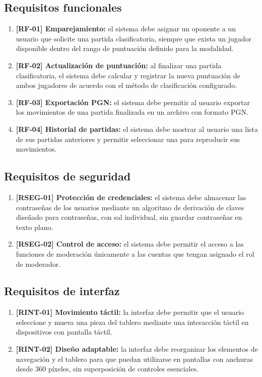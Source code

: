\documentclass[12pt,a4paper]{article}
\begin{document}
\subsection{Requisitos funcionales}

\begin{enumerate}[leftmargin=*]
    \item \textbf{[RF-01] Emparejamiento:} el sistema debe asignar un oponente a un usuario que solicite una partida clasificatoria, siempre que exista un jugador disponible dentro del rango de puntuación definido para la modalidad.
    \item \textbf{[RF-02] Actualización de puntuación:} al finalizar una partida clasificatoria, el sistema debe calcular y registrar la nueva puntuación de ambos jugadores de acuerdo con el método de clasificación configurado.
    \item \textbf{[RF-03] Exportación PGN:} el sistema debe permitir al usuario exportar los movimientos de una partida finalizada en un archivo con formato PGN.
    \item \textbf{[RF-04] Historial de partidas:} el sistema debe mostrar al usuario una lista de sus partidas anteriores y permitir seleccionar una para reproducir sus movimientos.
\end{enumerate}

\subsection{Requisitos de seguridad}

\begin{enumerate}[leftmargin=*]
    \item \textbf{[RSEG-01] Protección de credenciales:} el sistema debe almacenar las contraseñas de los usuarios mediante un algoritmo de derivación de claves diseñado para contraseñas, con sal individual, sin guardar contraseñas en texto plano.
    \item \textbf{[RSEG-02] Control de acceso:} el sistema debe permitir el acceso a las funciones de moderación únicamente a las cuentas que tengan asignado el rol de moderador.
\end{enumerate}

\subsection{Requisitos de interfaz}

\begin{enumerate}[leftmargin=*]
    \item \textbf{[RINT-01] Movimiento táctil:} la interfaz debe permitir que el usuario seleccione y mueva una pieza del tablero mediante una interacción táctil en dispositivos con pantalla táctil.
    \item \textbf{[RINT-02] Diseño adaptable:} la interfaz debe reorganizar los elementos de navegación y el tablero para que puedan utilizarse en pantallas con anchuras desde 360 píxeles, sin superposición de controles esenciales.
\end{enumerate}
\end{document}
